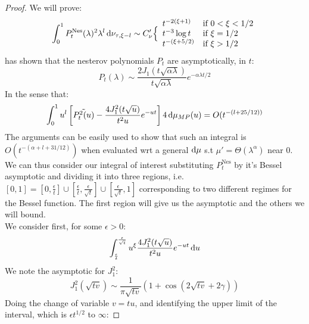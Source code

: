\documentclass{article}
\begin{document}
\nesterovrates * 


\begin{proof}
We will prove:
\begin{equation}
    \int_0^1P_t^{\text{Nes}}(\lambda)^2\lambda^l\mathop{}\!\mathrm{d}\nu_{\tau,\xi-l}\sim C'_\nu
    \Big\{\begin{array}{ll}
          t^{-2(\xi+1)}& \mbox{if } 
		  0<\xi<1/2  \\
		  t^{-3}\log t& \mbox{if } 
		  \xi=1/2\\
		  t^{-(\xi+5/2)}& \mbox{if } 
		  \xi>1/2
	\end{array}
\end{equation}
\cite{paquette2020halting} has shown that the nesterov polynomials $P_t$ are asymptotically, in $t$:
\begin{equation}
    P_t(\lambda)\sim\frac{2J_1(t\sqrt{\alpha\lambda})}{t\sqrt{\alpha\lambda}}e^{-\alpha\lambda t/2}
\end{equation}
In the sense that:
\begin{equation}
    \int_0^1u^{l}\left[\Tilde{P_t^2(u)}-\frac{4J_1^2(t\sqrt{u})}{t^2u}e^{-u t}\right]4\mathop{}\!\mathrm{d}\mu_{MP}(u)=O(t^{-(l+25/12))}
\end{equation}
The arguments can be easily used to show that such an integral is $O(t^{ -(\alpha+l+31/12)})$ when evaluated wrt a general $\mathop{}\!\mathrm{d}\mu$ s.t $\mu'=\Theta(\lambda^\alpha)$ near $0$. \\
We can thus consider our integral  of interest substituting $P_t^\text{Nes}$ by it's Bessel asymptotic and dividing it into three regions, i.e. $[0,1]=[0,\frac{\epsilon}{t}]\cup[\frac{\epsilon}{t},\frac{\epsilon}{\sqrt{t}}]\cup[\frac{\epsilon}{\sqrt{t}},1]$ corresponding to two different regimes for the Bessel function. The first region will give us the asymptotic and the others we will bound.\\
We consider first, for some $\epsilon>0$:
\begin{equation}
    \int_{\frac{\epsilon}{t}}^{\frac{\epsilon}{\sqrt{t}}} u^{\xi}\frac{4J_1^2(t\sqrt{u})}{t^2u}e^{-u t}\mathop{}\!\mathrm{d} u
\end{equation}
We note the asymptotic for $J_1^2$:
\begin{equation}
    J_1^2(\sqrt{tv}) \sim \frac{1}{\pi\sqrt{tv}}(1+\cos(2\sqrt{tv}+2\gamma))
\end{equation}
Doing the change of variable $v=tu$, and identifying the upper limit of the interval, which is $\epsilon t^{1/2}$ to $\infty$:


\end{proof}
\end{document}
